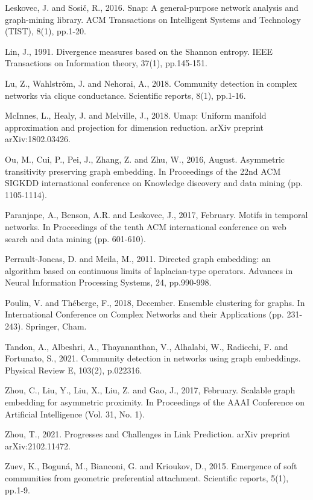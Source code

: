 \documentclass[11pt]{article}
\begin{document}
\begin{thebibliography}{10}
 Leskovec, J. and Sosič, R., 2016. Snap: A general-purpose network analysis and graph-mining library. ACM Transactions on Intelligent Systems and Technology (TIST), 8(1), pp.1-20.

 Lin, J., 1991. Divergence measures based on the Shannon entropy. IEEE Transactions on Information theory, 37(1), pp.145-151.

 Lu, Z., Wahlström, J. and Nehorai, A., 2018. Community detection in complex networks via clique conductance. Scientific reports, 8(1), pp.1-16.

 McInnes, L., Healy, J. and Melville, J., 2018. Umap: Uniform manifold approximation and projection for dimension reduction. arXiv preprint arXiv:1802.03426.

 Ou, M., Cui, P., Pei, J., Zhang, Z. and Zhu, W., 2016, August. Asymmetric transitivity preserving graph embedding. In Proceedings of the 22nd ACM SIGKDD international conference on Knowledge discovery and data mining (pp. 1105-1114).

 Paranjape, A., Benson, A.R. and Leskovec, J., 2017, February. Motifs in temporal networks. In Proceedings of the tenth ACM international conference on web search and data mining (pp. 601-610).

 Perrault-Joncas, D. and Meila, M., 2011. Directed graph embedding: an algorithm based on continuous limits of laplacian-type operators. Advances in Neural Information Processing Systems, 24, pp.990-998.

 Poulin, V. and Théberge, F., 2018, December. Ensemble clustering for graphs. In International Conference on Complex Networks and their Applications (pp. 231-243). Springer, Cham.

 Tandon, A., Albeshri, A., Thayananthan, V., Alhalabi, W., Radicchi, F. and Fortunato, S., 2021. Community detection in networks using graph embeddings. Physical Review E, 103(2), p.022316.

 Zhou, C., Liu, Y., Liu, X., Liu, Z. and Gao, J., 2017, February. Scalable graph embedding for asymmetric proximity. In Proceedings of the AAAI Conference on Artificial Intelligence (Vol. 31, No. 1).

 Zhou, T., 2021. Progresses and Challenges in Link Prediction. arXiv preprint arXiv:2102.11472.

 Zuev, K., Boguná, M., Bianconi, G. and Krioukov, D., 2015. Emergence of soft communities from geometric preferential attachment. Scientific reports, 5(1), pp.1-9.

\end{thebibliography}

\appendix




\end{document}
